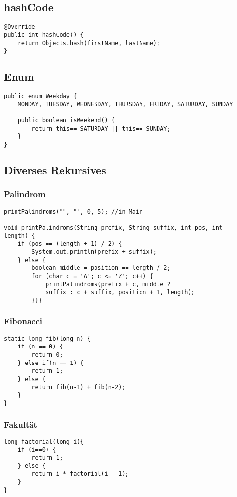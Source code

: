 \begin{multicols*}{5}
	\subsection{hashCode}
		\begin{lstlisting}
@Override
public int hashCode() {
	return Objects.hash(firstName, lastName);
}
		\end{lstlisting}
	
	
	\subsection{Enum}
	\begin{lstlisting}
public enum Weekday {
	MONDAY, TUESDAY, WEDNESDAY, THURSDAY, FRIDAY, SATURDAY, SUNDAY 
	
	public boolean isWeekend() {
		return this== SATURDAY || this== SUNDAY;
	}
}
	\end{lstlisting}


	
	\subsection{Diverses Rekursives}
	\subsubsection{Palindrom}
	\begin{lstlisting}
printPalindroms("", "", 0, 5); //in Main

void printPalindroms(String prefix, String suffix, int pos, int length) {
	if (pos == (length + 1) / 2) {
		System.out.println(prefix + suffix);
	} else {
		boolean middle = position == length / 2;
		for (char c = 'A'; c <= 'Z'; c++) {
			printPalindroms(prefix + c, middle ? 
			suffix : c + suffix, position + 1, length);
		}}}
	\end{lstlisting}

	\columnbreak

	\subsubsection{Fibonacci}
		\begin{lstlisting}
static long fib(long n) {
	if (n == 0) {
		return 0;
	} else if(n == 1) { 
		return 1;
	} else { 
		return fib(n-1) + fib(n-2);	
	} 
}
		\end{lstlisting}
	
	
	\subsubsection{Fakultät}
	\begin{lstlisting}
long factorial(long i){
	if (i==0) {
		return 1; 
	} else {
		return i * factorial(i - 1);
	}
}
	\end{lstlisting}
	

\end{multicols*}
